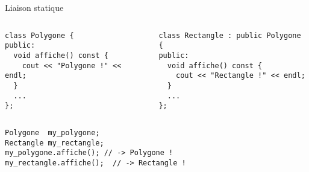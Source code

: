 \documentclass[c]{beamer}
\begin{document}
\begin{frame}[fragile]{Liaison statique}

\begin{columns}
\begin{column}{0.5\columnwidth}
\begin{verbatim}
class Polygone {
public:
  void affiche() const {
    cout << "Polygone !" << endl;
  }
  ...
};
\end{verbatim}
\end{column}
\begin{column}{0.5\columnwidth}
\begin{verbatim}
class Rectangle : public Polygone {
public:
  void affiche() const {
    cout << "Rectangle !" << endl;
  }
  ...
};
\end{verbatim}
\end{column}
\end{columns}

\vspace{1em}
\pause

\begin{columns}
\begin{column}{0.5\columnwidth}
\begin{verbatim}
Polygone  my_polygone;
Rectangle my_rectangle;
my_polygone.affiche(); // -> Polygone !
my_rectangle.affiche();  // -> Rectangle !
\end{verbatim}
\end{column}
\end{columns}

\begin{center}
\end{center}
\vspace{1.2em}
\end{frame}

\end{document}
